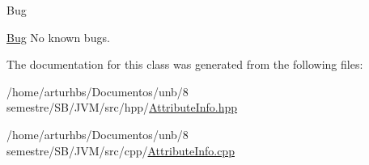 \begin{DoxyRefDesc}{Bug}
\item[\hyperlink{bug__bug000009}{Bug}]No known bugs. \end{DoxyRefDesc}


The documentation for this class was generated from the following files\+:\begin{DoxyCompactItemize}
\item 
/home/arturhbs/\+Documentos/unb/8 semestre/\+S\+B/\+J\+V\+M/src/hpp/\hyperlink{AttributeInfo_8hpp}{Attribute\+Info.\+hpp}\item 
/home/arturhbs/\+Documentos/unb/8 semestre/\+S\+B/\+J\+V\+M/src/cpp/\hyperlink{AttributeInfo_8cpp}{Attribute\+Info.\+cpp}\end{DoxyCompactItemize}
